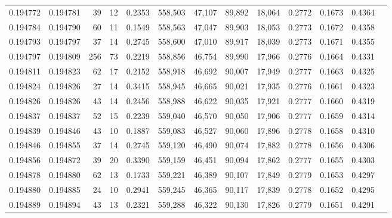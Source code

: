 \begin{tabular}{rrrrrrrrrrrrr}
0.194772 & 0.194781 &    39 &  12 &                                     0.2353 & 558,503 &  47,107 &  89,892 &  18,064 & 0.2772 & 0.1673 & 0.4364 \\
0.194784 & 0.194790 &    60 &  11 &                                     0.1549 & 558,563 &  47,047 &  89,903 &  18,053 & 0.2773 & 0.1672 & 0.4358 \\
0.194793 & 0.194797 &    37 &  14 &                                     0.2745 & 558,600 &  47,010 &  89,917 &  18,039 & 0.2773 & 0.1671 & 0.4355 \\
0.194797 & 0.194809 &   256 &  73 &                                     0.2219 & 558,856 &  46,754 &  89,990 &  17,966 & 0.2776 & 0.1664 & 0.4331 \\
0.194811 & 0.194823 &    62 &  17 &                                     0.2152 & 558,918 &  46,692 &  90,007 &  17,949 & 0.2777 & 0.1663 & 0.4325 \\
0.194824 & 0.194826 &    27 &  14 &                                     0.3415 & 558,945 &  46,665 &  90,021 &  17,935 & 0.2776 & 0.1661 & 0.4323 \\
0.194826 & 0.194826 &    43 &  14 &                                     0.2456 & 558,988 &  46,622 &  90,035 &  17,921 & 0.2777 & 0.1660 & 0.4319 \\
0.194837 & 0.194837 &    52 &  15 &                                     0.2239 & 559,040 &  46,570 &  90,050 &  17,906 & 0.2777 & 0.1659 & 0.4314 \\
0.194839 & 0.194846 &    43 &  10 &                                     0.1887 & 559,083 &  46,527 &  90,060 &  17,896 & 0.2778 & 0.1658 & 0.4310 \\
0.194846 & 0.194855 &    37 &  14 &                                     0.2745 & 559,120 &  46,490 &  90,074 &  17,882 & 0.2778 & 0.1656 & 0.4306 \\
0.194856 & 0.194872 &    39 &  20 &                                     0.3390 & 559,159 &  46,451 &  90,094 &  17,862 & 0.2777 & 0.1655 & 0.4303 \\
0.194878 & 0.194880 &    62 &  13 &                                     0.1733 & 559,221 &  46,389 &  90,107 &  17,849 & 0.2779 & 0.1653 & 0.4297 \\
0.194880 & 0.194885 &    24 &  10 &                                     0.2941 & 559,245 &  46,365 &  90,117 &  17,839 & 0.2778 & 0.1652 & 0.4295 \\
0.194889 & 0.194894 &    43 &  13 &                                     0.2321 & 559,288 &  46,322 &  90,130 &  17,826 & 0.2779 & 0.1651 & 0.4291 \\

\end{tabular}
